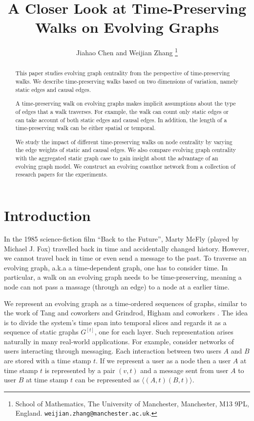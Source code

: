 \documentclass[12pt]{article}
\title{A Closer Look at Time-Preserving Walks on Evolving Graphs}
\author{Jiahao Chen and
Weijian Zhang
\thanks{%
  School of Mathematics,
The University of Manchester,
                Manchester, M13 9PL, England.
\texttt{weijian.zhang@manchester.ac.uk}.
}
}
\theoremstyle{definition}
\begin{document}


\maketitle

\begin{abstract}
This paper studies evolving graph centrality from the perspective of time-preserving walks. We describe time-preserving walks based on two dimensions of variation, namely static edges and causal edges.

A time-preserving walk on evolving graphs makes implicit assumptions about the type of edges that a walk traverses. For example, the walk can count only static edges or can take account of both static edges and causal edges. In addition, the length of a time-preserving walk can be either spatial or temporal.

We study the impact of different time-preserving walks on node centrality by varying the edge weights of static and causal edges.
We also compare evolving graph centrality with the aggregated static graph case to gain insight about the advantage of an evolving graph model.
We construct an evolving coauthor network from a collection of research papers for the experiments.
\end{abstract}

\section{Introduction}
\label{sec:introduction}

In the 1985 science-fiction film ``Back to the Future'', Marty McFly (played by Michael J. Fox) travelled back in time and accidentally changed history.
However, we cannot travel back in time or even send a message to the past.
To traverse an evolving graph, a.k.a a time-dependent graph, one has to consider time. In particular, a walk on an evolving graph needs to be time-preserving, meaning a node can not pass a massage (through an edge) to a node at a earlier time.

We represent an evolving graph as a time-ordered sequences of graphs, similar to the work of Tang and coworkers \cite{nicosia13, tang09, tang102, tang10} and Grindrod, Higham and coworkers \cite{grindrod13,grindrod11}. The idea is to divide the system's time span into temporal slices and regards it as a sequence of static graphs $G^{[t]}$, one for each layer. Such representation arises naturally in many real-world applications. For example,
consider networks of users interacting through messaging. Each interaction between two users $A$ and $B$ are stored with a time stamp $t$. If we represent a user as a node then a user $A$ at time stamp $t$ is represented by a pair $(v,t)$ and a message sent from user $A$ to user $B$ at time stamp $t$ can be represented as $\langle (A, t) (B, t) \rangle$.
\end{document}
